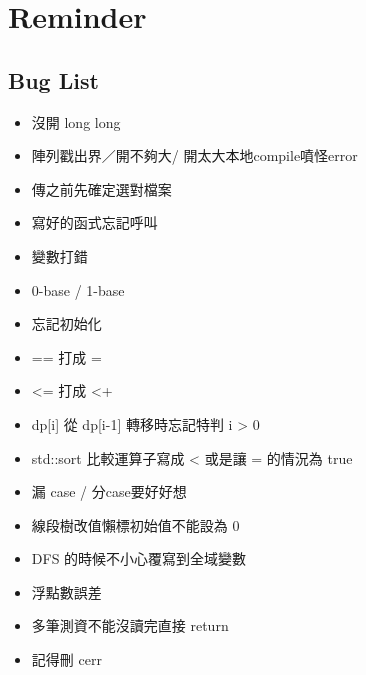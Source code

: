 \documentclass[a4paper,10pt,twocolumn,oneside,x11names]{article}
\begin{document}
\renewcommand{\headrulewidth}{0.4pt}
\renewcommand{\contentsname}{Contents} 

\pagestyle{fancy}
\fancyfoot{}
\fancyhead[R]{\thepage}


{\scriptsize
\begin{multicols}{2}
\tableofcontents
\end{multicols}}

\section{Reminder}
\subsection{Bug List}
\begin{itemize}[nolistsep]
\item 沒開 long long
\item 陣列戳出界／開不夠大/ 開太大本地compile噴怪error
\item 傳之前先確定選對檔案
\item 寫好的函式忘記呼叫
\item 變數打錯
\item 0-base / 1-base
\item 忘記初始化
\item == 打成 =
\item <= 打成 <+
\item dp[i] 從 dp[i-1] 轉移時忘記特判 i > 0
\item std::sort 比較運算子寫成 < 或是讓 = 的情況為 true
\item 漏 case / 分case要好好想
\item 線段樹改值懶標初始值不能設為 0
\item DFS 的時候不小心覆寫到全域變數
\item 浮點數誤差
\item 多筆測資不能沒讀完直接 return
\item 記得刪 cerr
\end{itemize}

\end{document}
